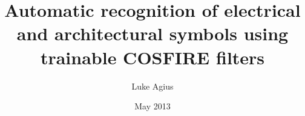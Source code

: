 \title{Automatic recognition of electrical and architectural symbols using \\ trainable COSFIRE filters}
\author{Luke Agius}
\date{May 2013}
